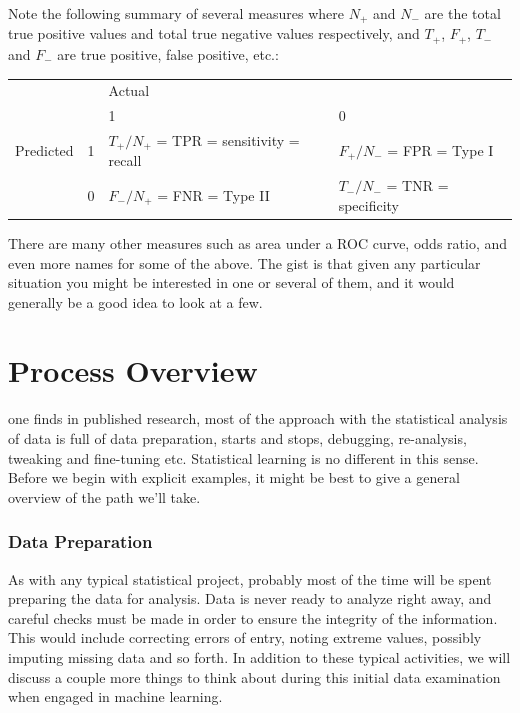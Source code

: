 \documentclass[english,nohyper,titlepage]{tufte-handout}
\begin{document}
Note the following summary of several measures where $N_+$ and $N_-$ are the total true positive values and total true negative values respectively, and $T_+$, $F_+$, $T_-$ and $F_-$ are true positive, false positive, etc.:
\vspace{.25cm}

{\footnotesize
\noindent\begin{tabular}{llll}
&  & Actual  & \\
& & 1 & 0 \\
\hline
Predicted & 1 & $T_+/N_+$ = TPR = sensitivity = recall & $F_+/N_-$ = FPR = Type I \\
& 0 & $F_-/N_+$ = FNR = Type II & $T_-/N_-$ = TNR = specificity \\
\hline
\end{tabular} 
}


\vspace{.25cm}
There are many other measures such as area under a ROC curve, odds ratio, and even more names for some of the above.  The gist is that given any particular situation you might be interested in one or several of them, and it would generally be a good idea to look at a few.







\part{Process Overview}
 one finds in published research, most of the approach with the statistical analysis of data is full of data preparation, starts and stops, debugging, re-analysis, tweaking and fine-tuning etc. Statistical learning is no different in this sense.  Before we begin with explicit examples, it might be best to give a general overview of the path we'll take.

\section{Data Preparation}
As with any typical statistical project, probably most of the time will be spent preparing the data for analysis.  Data is never ready to analyze right away, and careful checks must be made in order to ensure the integrity of the information.  This would include correcting errors of entry, noting extreme values, possibly imputing missing data and so forth.  In addition to these typical activities, we will discuss a couple more things to think about during this initial data examination when engaged in machine learning.
\end{document}

